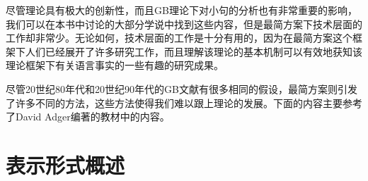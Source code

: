 尽管\xbarc 理论具有极大的创新性，而且GB理论下对小句的分析也有非常重要的影响，我们可以在本书中讨论的大部分学说中找到这些内容，但是最简方案下技术层面的工作却非常少。无论如何，技术层面的工作是十分有用的，因为在最简方案这个框架下人们已经展开了许多研究工作，而且理解该理论的基本机制可以有效地获知该理论框架下有关语言事实的一些有趣的研究成果。


尽管20世纪80年代和20世纪90年代的GB文献有很多相同的假设，最简方案则引发了许多不同的方法，这些方法使得我们难以跟上理论的发展。下面的内容主要参考了David Adger编著的教材中的内容\citep{Adger2003a}。

\section{表示形式概述}

